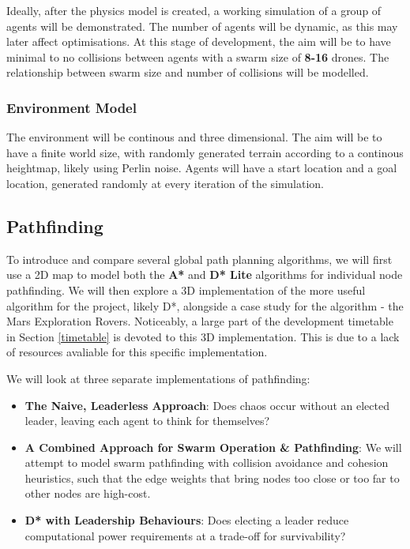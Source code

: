 \documentclass{article}
\begin{document}
Ideally, after the physics model is created, a working simulation of a group of agents will be demonstrated. The number of agents will be dynamic, as this may later affect optimisations. At this stage of development, the aim will be to have minimal to no collisions between agents with a swarm size of \textbf{8-16} drones. The relationship between swarm size and number of collisions will be modelled.

\subsubsection{Environment Model}
The environment will be continous and three dimensional. The aim will be to have a finite world size, with randomly generated terrain according to a continous heightmap, likely using Perlin noise\cite{10.1145/325165.325247}. Agents will have a start location and a goal location, generated randomly at every iteration of the simulation.

\subsection{Pathfinding}
To introduce and compare several global path planning algorithms, we will first use a 2D map to model both the \textbf{A*}\cite{4082128} and \textbf{D* Lite}\cite{dstar} algorithms for individual node pathfinding. We will then explore a 3D implementation of the more useful algorithm for the project, likely D*, alongside a case study for the algorithm - the Mars Exploration Rovers\cite{4161272}. Noticeably, a large part of the development timetable in Section \ref{timetable} is devoted to this 3D implementation. This is due to a lack of resources avaliable for this specific implementation.

We will look at three separate implementations of pathfinding:

\begin{itemize}
    \item \textbf{The Naive, Leaderless Approach}: Does chaos occur without an elected leader, leaving each agent to think for themselves?
    \item \textbf{A Combined Approach for Swarm Operation \& Pathfinding}: We will attempt to model swarm pathfinding with collision avoidance and cohesion heuristics, such that the edge weights that bring nodes too close or too far to other nodes are high-cost.
    \item \textbf{D* with Leadership Behaviours}: Does electing a leader reduce computational power requirements at a trade-off for survivability?
\end{itemize}
\end{document}
